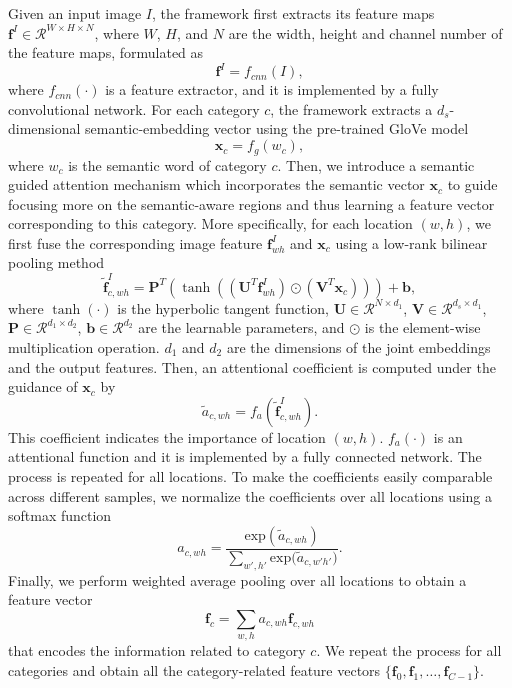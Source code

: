 \documentclass[10pt,twocolumn,letterpaper]{article}
\begin{document}
Given an input image $I$, the framework first extracts its feature maps $\mathbf{f}^I \in \mathcal{R}^{W\times H \times N}$, where $W$, $H$, and $N$ are the width, height and channel number of the feature maps, formulated as
\begin{equation}
  \mathbf{f}^I=f_{cnn}(I),
  \label{eq:image-feature-extraction}
\end{equation}
where $f_{cnn}(\cdot)$ is a feature extractor, and it is implemented by a fully convolutional network. For each category $c$, the framework extracts a $d_s$-dimensional semantic-embedding vector using the pre-trained GloVe \cite{pennington2014glove} model
\begin{equation}
  \mathbf{x}_c=f_{g}(w_c),
  \label{eq:semantic-feature-extraction}
\end{equation}
where $w_c$ is the semantic word of category $c$. Then, we introduce a semantic guided attention mechanism which incorporates the semantic vector $\mathbf{x}_c$ to guide focusing more on the semantic-aware regions and thus learning a feature vector corresponding to this category. More specifically, for each location $(w, h)$, we first fuse the corresponding image feature $\mathbf{f}^I_{wh}$ and $\mathbf{x}_c$ using a low-rank bilinear pooling method \cite{kim2016hadamard}
\begin{equation}
  \tilde{\mathbf{f}}^I_{c,wh}=\mathbf{P}^T\left(\tanh\left((\mathbf{U}^T\mathbf{f}^I_{wh})\odot(\mathbf{V}^T\mathbf{x}_c)\right)\right)+\mathbf{b},
\end{equation}
where $\tanh(\cdot)$ is the hyperbolic tangent function, $\mathbf{U}\in \mathcal{R}^{N\times d_1}$, $\mathbf{V}\in \mathcal{R}^{d_s\times d_1}$, $\mathbf{P}\in \mathcal{R}^{d_1\times d_2}$, $\mathbf{b}\in \mathcal{R}^{d_2}$ are the learnable parameters, and $\odot$ is the element-wise multiplication operation. $d_1$ and $d_2$ are the dimensions of the joint embeddings and the output features. Then, an attentional coefficient is computed under the guidance of $\mathbf{x}_c$ by
\begin{equation}
  \tilde{a}_{c,wh}=f_{a}(\tilde{\mathbf{f}}^I_{c,wh}).
\end{equation}
This coefficient indicates the importance of location $(w, h)$. $f_{a}(\cdot)$ is an attentional function and it is implemented by a fully connected network. The process is repeated for all locations. To make the coefficients easily comparable across different samples, we normalize the coefficients over all locations using a softmax function
\begin{equation}
  a_{c,wh}=\frac{\mathrm{exp}(\tilde{a}_{c,wh})}{\sum_{w',h'}{\mathrm{exp}(\tilde{a}_{c,w'h'}})}.
\end{equation}
Finally, we perform weighted average pooling over all locations to obtain a feature vector
\begin{equation}
  \mathbf{f}_{c}=\sum_{w,h}a_{c,wh}\mathbf{f}_{c,wh}
\end{equation}
that encodes the information related to category $c$. We repeat the process for all categories and obtain all the category-related feature vectors $\{\mathbf{f}_{0}, \mathbf{f}_{1}, \dots, \mathbf{f}_{C-1}\}$.
\end{document}
